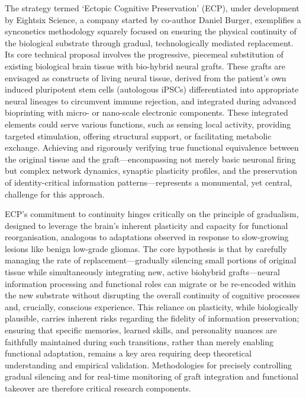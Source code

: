 \documentclass[10pt]{article}
\begin{document}
\begin{sloppypar}
  The strategy termed ‘Ectopic Cognitive Preservation’ (ECP), under development by Eightsix Science, a company started by co-author Daniel Burger, exemplifies a synconetics methodology squarely focused on ensuring the physical continuity of the biological substrate through gradual, technologically mediated replacement. Its core technical proposal involves the progressive, piecemeal substitution of existing biological brain tissue with bio-hybrid neural grafts. These grafts are envisaged as constructs of living neural tissue, derived from the patient’s own induced pluripotent stem cells (autologous iPSCs) differentiated into appropriate neural lineages to circumvent immune rejection, and integrated during advanced bioprinting with micro- or nano-scale electronic components. These integrated elements could serve various functions, such as sensing local activity, providing targeted stimulation, offering structural support, or facilitating metabolic exchange. Achieving and rigorously verifying true functional equivalence between the original tissue and the graft—encompassing not merely basic neuronal firing but complex network dynamics, synaptic plasticity profiles, and the preservation of identity-critical information patterns—represents a monumental, yet central, challenge for this approach.

  ECP’s commitment to continuity hinges critically on the principle of gradualism, designed to leverage the brain’s inherent plasticity and capacity for functional reorganisation, analogous to adaptations observed in response to slow-growing lesions like benign low-grade gliomas. The core hypothesis is that by carefully managing the rate of replacement—gradually silencing small portions of original tissue while simultaneously integrating new, active biohybrid grafts—neural information processing and functional roles can migrate or be re-encoded within the new substrate without disrupting the overall continuity of cognitive processes and, crucially, conscious experience. This reliance on plasticity, while biologically plausible, carries inherent risks regarding the fidelity of information preservation; ensuring that specific memories, learned skills, and personality nuances are faithfully maintained during such transitions, rather than merely enabling functional adaptation, remains a key area requiring deep theoretical understanding and empirical validation. Methodologies for precisely controlling gradual silencing and for real-time monitoring of graft integration and functional takeover are therefore critical research components.


\end{sloppypar}
\end{document}
